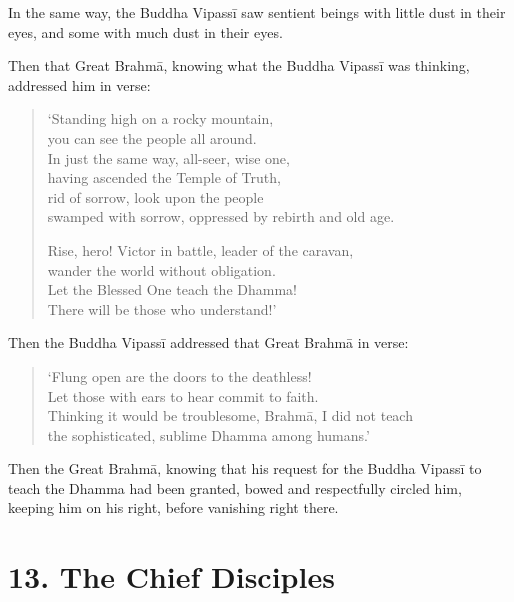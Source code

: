 \documentclass[12pt,openany]{book}%
\begin{document}
In the same way, the Buddha \textsanskrit{Vipassī} saw sentient beings with little dust in their eyes, and some with much dust in their eyes. 

Then that Great \textsanskrit{Brahmā}, knowing what the Buddha \textsanskrit{Vipassī} was thinking, addressed him in verse: 

\begin{verse}%
‘Standing high on a rocky mountain, \\
you can see the people all around. \\
In just the same way, all-seer, wise one, \\
having ascended the Temple of Truth, \\
rid of sorrow, look upon the people \\
swamped with sorrow, oppressed by rebirth and old age. 

Rise, hero! Victor in battle, leader of the caravan, \\
wander the world without obligation. \\
Let the Blessed One teach the Dhamma! \\
There will be those who understand!’ 

%
\end{verse}

Then the Buddha \textsanskrit{Vipassī} addressed that Great \textsanskrit{Brahmā} in verse: 

\begin{verse}%
‘Flung open are the doors to the deathless! \\
Let those with ears to hear commit to faith. \\
Thinking it would be troublesome, \textsanskrit{Brahmā}, I did not teach \\
the sophisticated, sublime Dhamma among humans.’ 

%
\end{verse}

Then the Great \textsanskrit{Brahmā}, knowing that his request for the Buddha \textsanskrit{Vipassī} to teach the Dhamma had been granted, bowed and respectfully circled him, keeping him on his right, before vanishing right there. 

\section*{13. The Chief Disciples }
\end{document}
